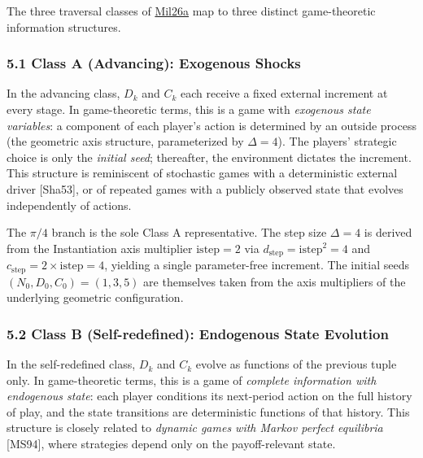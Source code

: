 \documentclass[
  11pt,
  letterpaper,
]{article}
\begin{document}
The three traversal classes of
\href{https://github.com/baardev/truevalue/blob/main/docnav/Research/papers/1_recursive-tholonic-five-constants/1_recursive-tholonic-five-constants.pdf}{Mil26a}
map to three distinct game-theoretic information structures.

\subsubsection{5.1 Class A (Advancing): Exogenous
Shocks}\label{class-a-advancing-exogenous-shocks}

In the advancing class, \(D_k\) and \(C_k\) each receive a fixed
external increment at every stage. In game-theoretic terms, this is a
game with \emph{exogenous state variables}: a component of each player's
action is determined by an outside process (the geometric axis
structure, parameterized by \(\Delta = 4\)). The players' strategic
choice is only the \emph{initial seed}; thereafter, the environment
dictates the increment. This structure is reminiscent of stochastic
games with a deterministic external driver {[}Sha53{]}, or of repeated
games with a publicly observed state that evolves independently of
actions.

The \(\pi/4\) branch is the sole Class A representative. The step size
\(\Delta = 4\) is derived from the Instantiation axis multiplier
\(\mathrm{istep} = 2\) via \(d_{\mathrm{step}} = \mathrm{istep}^2 = 4\)
and \(c_{\mathrm{step}} = 2 \times \mathrm{istep} = 4\), yielding a
single parameter-free increment. The initial seeds
\((N_0, D_0, C_0) = (1, 3, 5)\) are themselves taken from the axis
multipliers of the underlying geometric configuration.

\subsubsection{5.2 Class B (Self-redefined): Endogenous State
Evolution}\label{class-b-self-redefined-endogenous-state-evolution}

In the self-redefined class, \(D_k\) and \(C_k\) evolve as functions of
the previous tuple only. In game-theoretic terms, this is a game of
\emph{complete information with endogenous state}: each player
conditions its next-period action on the full history of play, and the
state transitions are deterministic functions of that history. This
structure is closely related to \emph{dynamic games with Markov perfect
equilibria} {[}MS94{]}, where strategies depend only on the
payoff-relevant state.
\end{document}
